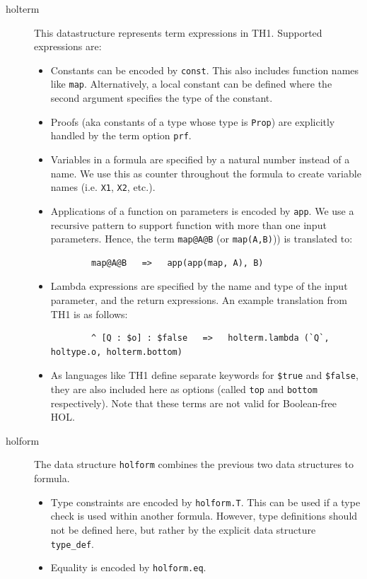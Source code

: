 \documentclass[a4paper]{article}
\begin{document}
\begin{description}
\begin{itemize}
	\end{itemize}
	\item[holterm] This datastructure represents term expressions in TH1. Supported expressions are:
	\begin{itemize}
		\item Constants can be encoded by \texttt{const}. This also includes function names like \texttt{map}. Alternatively, a local constant can be defined where the second argument specifies the type of the constant.
		\item Proofs (aka constants of a type whose type is \texttt{Prop}) are explicitly handled by the term option \texttt{prf}.
		\item Variables in a formula are specified by a natural number instead of a name. We use this as counter throughout the formula to create variable names (i.e. \texttt{X1}, \texttt{X2}, etc.).
		\item Applications of a function on parameters is encoded by \texttt{app}. We use a recursive pattern to support function with more than one input parameters. Hence, the term \texttt{map@A@B} (or \texttt{map(A,B)})) is translated to:
		\begin{verbatim}
		map@A@B   =>   app(app(map, A), B)
		\end{verbatim}
		\item Lambda expressions are specified by the name and type of the input parameter, and the return expressions. An example translation from TH1 is as follows:
		\begin{verbatim}
		^ [Q : $o] : $false   =>   holterm.lambda (`Q`, holtype.o, holterm.bottom)
		\end{verbatim}
		\item As languages like TH1 define separate keywords for \texttt{\$true} and \texttt{\$false}, they are also included here as options (called \texttt{top} and \texttt{bottom} respectively). Note that these terms are not valid for Boolean-free HOL. 
	\end{itemize}
	\item[holform] The data structure \texttt{holform} combines the previous two data structures to formula. 
	\begin{itemize}
		\item Type constraints are encoded by \texttt{holform.T}. This can be used if a type check is used within another formula. However, type definitions should not be defined here, but rather by the explicit data structure \texttt{type\_def}.
		\item Equality is encoded by \texttt{holform.eq}.

\end{itemize}
\end{description}
\end{document}
